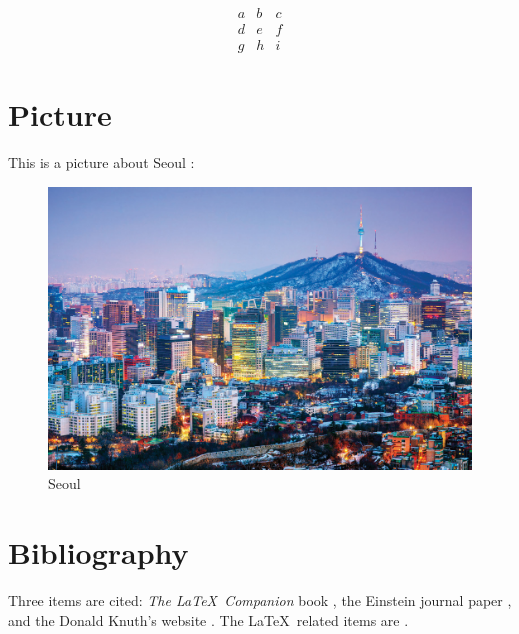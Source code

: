 \[
 \begin{matrix}
  a & b & c \\
  d & e & f \\
  g & h & i
 \end{matrix}
\]

\section{Picture}

This is a picture about Seoul :

\begin{figure}
  \includegraphics[width=\linewidth]{seoul.png}
  \caption{Seoul}
  \label{fig:seoul1}
\end{figure}

\section{Bibliography}
Three items are cited: \textit{The \LaTeX\ Companion} book \cite{latexcompanion}, the Einstein
journal paper \cite{einstein}, and the Donald Knuth's website \cite{knuthwebsite}. 
The \LaTeX\ related items are \cite{latexcompanion,knuthwebsite}. 
 
\medskip
 






